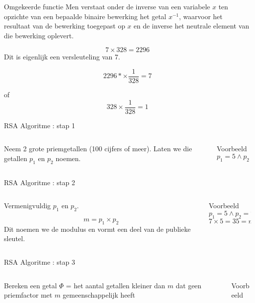 \documentclass{beamer}
\begin{document}
\begin{frame}{Omgekeerde functie}
	Men verstaat onder de inverse van een variabele $x$ ten opzichte van een bepaalde binaire bewerking het getal $x^{-1}$, waarvoor het resultaat van de bewerking toegepast op $x$ en de inverse het neutrale element van die bewerking oplevert.
	
	\[
		7 \times 328 = 2296
	\]
	Dit is eigenlijk een versleuteling van 7.
	
	\[ 
		2296 * \times \frac{1}{328} = 7
	\]
	
	of 
	\[ 
		328 \times \frac{1}{328} = 1
	\]
\end{frame}

\begin{frame}{RSA Algoritme : stap 1}
	\begin{columns}
		\begin{column}[T]{0.5\textwidth}
			Neem 2 grote priemgetallen (100 cijfers of meer). 
			Laten we die getallen $p_1$ en $p_2$ noemen.
		\end{column}
			\begin{column}[T]{0.5\textwidth}
				Voorbeeld
		\[ p_1 = 5 \wedge  p_2 = 7\]
		\end{column}
	\end{columns}
	
	

\end{frame}

\begin{frame}{RSA Algoritme : stap 2}
	\begin{columns}
		\begin{column}[T]{0.5\textwidth}
Vermenigvuldig $p_1$ en $p_2$. 

\[ m = p_1 \times p_2  \]
Dit noemen we de modulus en vormt een deel van de publieke sleutel. 
		\end{column}
		\begin{column}[T]{0.5\textwidth}
			Voorbeeld
			\[ p_1 = 5 \wedge  p_2 = 7\]
			\[ 7 \times 5 = 35 = m \]
		\end{column}
	\end{columns}	
\end{frame}

\begin{frame}{RSA Algoritme : stap 3}
	\begin{columns}
		\begin{column}[T]{0.5\textwidth}
			Bereken een getal $\Phi$ =  het aantal getallen kleiner dan $m$ dat geen priemfactor met $m$ gemeenschappelijk heeft
		\end{column}
		\begin{column}[T]{0.5\textwidth}
			Voorbeeld

		\end{column}
	\end{columns}	
\end{frame}
\end{document}
